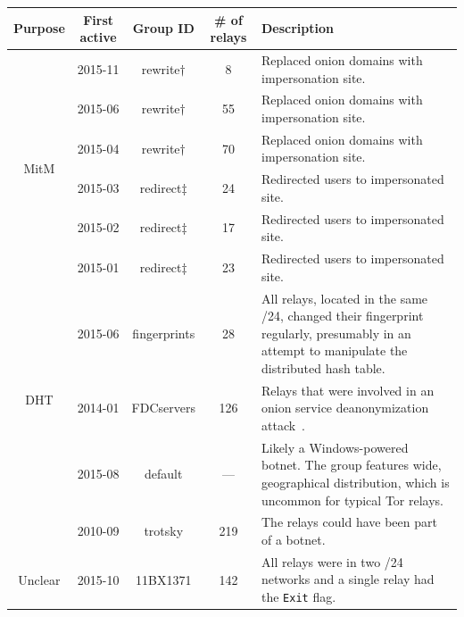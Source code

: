 \begin{table}[t]
\centering
\begin{tabularx}{\textwidth}{c|c c c X}
\textbf{Purpose} & \textbf{First active} & \textbf{Group ID} & \textbf{\# of
relays} & \textbf{Description} \\
\hline

\multirow{6}{*}{MitM}
& 2015-11 & rewrite$\dagger$ & 8 & Replaced onion domains with impersonation
site. \\

& 2015-06 & rewrite$\dagger$ & 55 & Replaced onion domains with impersonation
site. \\

& 2015-04 & rewrite$\dagger$ & 70 & Replaced onion domains with impersonation
site. \\

& 2015-03 & redirect$\ddagger$ & 24 & Redirected users to impersonated site.
\\

& 2015-02 & redirect$\ddagger$ & 17 & Redirected users to impersonated site.
\\

& 2015-01 & redirect$\ddagger$ & 23 & Redirected users to impersonated site.
\\

\hline

\multirow{3}{*}{DHT}
& 2015-06 & fingerprints & 28 & All relays, located in the same /24, changed
their fingerprint regularly, presumably in an attempt to manipulate the
distributed hash table. \\

& 2014-01 & FDCservers & 126 & Relays that were involved in an onion service
deanonymization attack~\cite{cmucert}. \\

\hline

\multirow{2}{*}{Botnet}
& 2015-08 & default & --- & Likely a Windows-powered botnet.  The group features
wide, geographical distribution, which is uncommon for typical Tor relays. \\

& 2010-09 & trotsky & 219 & The relays could have been part of a botnet. \\

\hline

\multirow{5}{*}{Unclear}
& 2015-10 & 11BX1371 & 142 & All relays were in two /24 networks and a single
relay had the \texttt{Exit} flag.  \\


\end{tabularx}
\end{table}
